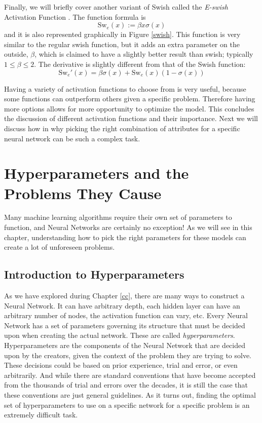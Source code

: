 \documentclass[12pt]{report}
\begin{document}
Finally, we will briefly cover another variant of Swish called the \emph{E-swish} Activation Function \cite{alcaide2018swish}. The function formula is
$$\text{Sw}_e(x) := \beta x \sigma(x)$$
and it is also represented graphically in Figure \ref{swish}.
This function is very similar to the regular swish function, but it adds an extra parameter on the outside, $\beta$, which is claimed to have a slightly better result than swish; typically $1 \leq \beta \leq 2$. The derivative is slightly different from that of the Swish function:
$$\text{Sw}_e'(x) = \beta \sigma(x) + \text{Sw}_e(x) (1 - \sigma(x))$$

Having a variety of activation functions to choose from is very useful, because some functions can outperform others given a specific problem.
Therefore having more options allows for more opportunity to optimize the model.
This concludes the discussion of different activation functions and their importance. Next we will discuss how in why picking the right combination of attributes for a specific neural network can be such a complex task.

\chapter{Hyperparameters and the Problems They Cause}
Many machine learning algorithms require their own set of parameters to function, and Neural Networks are certainly no exception! As we will see in this chapter, understanding how to pick the right parameters for these models can create a lot of unforeseen problems.

\section{Introduction to Hyperparameters}
As we have explored during Chapter \ref{cc}, there are many ways to construct a Neural Network. It can have arbitrary depth, each hidden layer can have an arbitrary number of nodes, the activation function can vary, etc.
Every Neural Network has a set of parameters governing its structure that must be decided upon when creating the actual network. These are called \emph{hyperparameters}. Hyperparameters are the components of the Neural Network that are decided upon by the creators, given the context of the problem they are trying to solve. These decisions could be based on prior experience, trial and error, or even arbitrarily. And while there are standard conventions that have become accepted from the thousands of trial and errors over the decades, it is still the case that these conventions are just general guidelines. As it turns out, finding the optimal set of hyperparameters to use on a specific network for a specific problem is an extremely difficult task.
\end{document}
